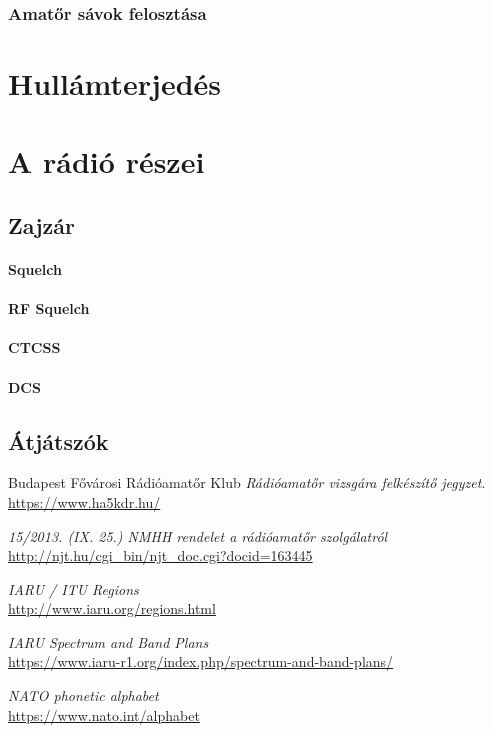 \documentclass[12pt,a4paper]{article}
\begin{document}
\subsubsection{Amatőr sávok felosztása}

\section{Hullámterjedés}

\section{A rádió részei}

\subsection{Zajzár}

\paragraph{Squelch}
\paragraph{RF Squelch}
\paragraph{CTCSS}
\paragraph{DCS}

\subsection{Átjátszók}
\newpage

\renewcommand{\refname}{Irodalomjegyzék}
\begin{thebibliography}{9}
Budapest Fővárosi Rádióamatőr Klub 
\textit{Rádióamatőr vizsgára felkészítő jegyzet}. 
\\\url{https://www.ha5kdr.hu/}

\textit{15/2013. (IX. 25.) NMHH rendelet a rádióamatőr szolgálatról} 
\\\url{http://njt.hu/cgi_bin/njt_doc.cgi?docid=163445}

\textit{IARU / ITU Regions} 
\\\url{http://www.iaru.org/regions.html}

\textit{IARU Spectrum and Band Plans} 
\\\url{https://www.iaru-r1.org/index.php/spectrum-and-band-plans/}


\textit{NATO phonetic alphabet} 
\\\url{https://www.nato.int/alphabet}

\end{thebibliography}
\end{document}

